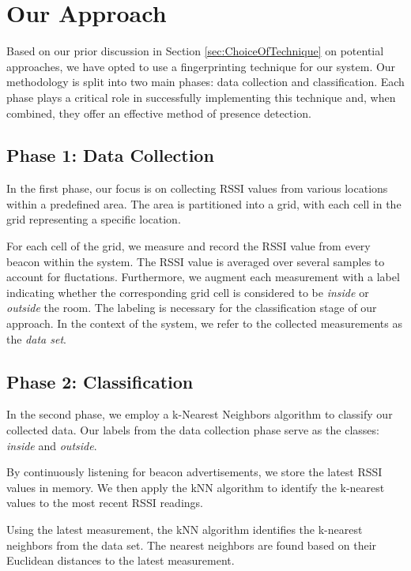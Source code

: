 \section{Our Approach}\label{sec:our_approach}
Based on our prior discussion in Section \ref{sec:ChoiceOfTechnique} on potential approaches, we have opted to use a fingerprinting technique for our system.
Our methodology is split into two main phases: data collection and classification.
Each phase plays a critical role in successfully implementing this technique and, when combined, they offer an effective method of presence detection.

\subsection{Phase 1: Data Collection}\label{sec:phase1_data_collection}
In the first phase, our focus is on collecting RSSI values from various locations within a predefined area. The area is partitioned into a grid, with each cell in the grid representing a specific location. 

For each cell of the grid, we measure and record the RSSI value from every beacon within the system.
The RSSI value is averaged over several samples to account for fluctations.
Furthermore, we augment each measurement with a label indicating whether the corresponding grid cell is considered to be \textit{inside} or \textit{outside} the room.
The labeling is necessary for the classification stage of our approach.
In the context of the system, we refer to the collected measurements as the \textit{data set}.

\subsection{Phase 2: Classification}\label{sec:phase2_classification}
In the second phase, we employ a k-Nearest Neighbors algorithm to classify our collected data. Our labels from the data collection phase serve as the classes: \textit{inside} and \textit{outside}.

By continuously listening for beacon advertisements, we store the latest RSSI values in memory. 
We then apply the kNN algorithm to identify the k-nearest values to the most recent RSSI readings.

Using the latest measurement, the kNN algorithm identifies the k-nearest neighbors from the data set. 
The nearest neighbors are found based on their Euclidean distances to the latest measurement.

